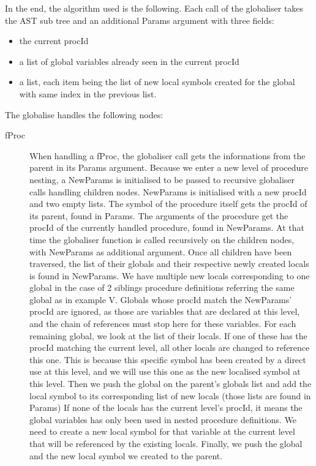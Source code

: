 \documentclass[a4paper]{memoir}
\begin{document}
In the end, the algorithm used is the following.
Each call of the globaliser takes the AST sub tree and an additional Params argument with three fields:
\begin{itemize}
   \item the current procId
   \item a list of global variables already seen in the current procId
   \item a list, each item being the list of new local symbols created for the global with same index in the previous list.
\end{itemize}

The globalise handles the following nodes:
\begin{description}
   \item[fProc] When handling a fProc, the globaliser call gets the informations from the parent in its Params argument. Because we enter a new level of procedure nesting, a NewParams is initialised to be passed to recursive globaliser calls handling children nodes. NewParams is initialised with a new procId and two empty lists. 
      The symbol of the procedure itself gets the procId of its parent, found in Params. The arguments of the procedure get the procId of the currently handled procedure, found in NewParams. At that time the globaliser function is called recursively on the children nodes, with NewParams as additional argument.
      Once all children have been traversed, the list of their globals and their respective newly created locals is found in NewParams.  We have multiple new locals corresponding to one global in the case of 2 siblings procedure definitions referring the same global as in example V. 
      Globals whose procId match the NewParams' procId are ignored, as those are variables that are declared at this level, and the chain of references must stop here for these variables.
      For each remaining global, we look at the list of their locals. 
      If one of these has the procId matching the current level, all other locals are changed to reference this one. This is because this specific symbol has been created by a direct use at this level, and we will use this one as the new localised symbol at this level. Then we push the global on the parent's globals list and add the local symbol to its corresponding list of new locals (those lists are found in Params)
      If none of the locals has the current level's procId, it means the global variables has only been used in nested procedure definitions. We need to create a new local symbol for that variable at the current level that will be referenced by the existing locals. Finally, we push the global and the new local symbol we created to the parent. 

\end{description}
\end{document}
